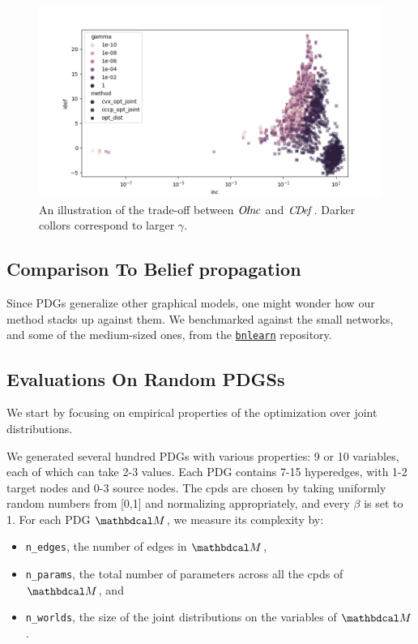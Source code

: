 \documentclass[twoside]{article}
\begin{document}
\begin{figure}
    \includegraphics[width=\linewidth]{figs/inc-idef2}
    \caption{An illustration of the trade-off between $\mathit{O\mskip-2.5muI\mskip-3.5mun\mskip-1.7muc}$ and $\mathit{C\mskip-3.5muD\mskip-2.5mue\mskip-1.5muf}_{}$. Darker collors correspond to larger $\gamma$.}\label{fig:inc-idef}
\end{figure}

\subsection{Comparison To Belief propagation}

Since PDGs generalize other graphical models, one might wonder how our method stacks up against them.
We benchmarked against the small networks, and some of the medium-sized ones, from the \href{https://www.bnlearn.com/bnrepository/}{\texttt{bnlearn}} repository.



\subsection{Evaluations On Random PDGSs}
We start by focusing on empirical properties of the optimization over joint distributions.

We generated several hundred PDGs with various properties: 9 or 10 variables, each of which can take 2-3 values. Each PDG contains 7-15 hyperedges, with 1-2 target nodes and 0-3 source nodes. The cpds are chosen by taking uniformly random numbers from [0,1] and normalizing appropriately, and every $\beta$ is set to 1.
For each PDG $\dg M$, we measure its complexity by:
\begin{itemize}[nosep]
    \item \texttt{n\_edges}, the number of edges in $\dg M$,
    \item \texttt{n\_params}, the total number of parameters across all the cpds of $\dg M$, and
    \item \texttt{n\_worlds}, the size of the joint distributions on the variables of $\dg M$.
\end{itemize}
\end{document}
